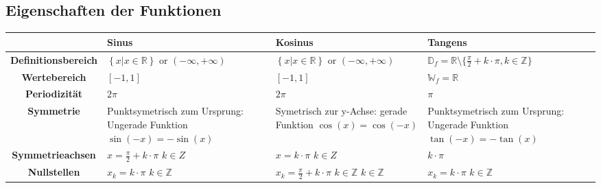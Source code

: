 \subsection{Eigenschaften der Funktionen}
\begin{tabularx}{1\textwidth} {
        | >{\raggedright\arraybackslash}c
        | >{\raggedright\arraybackslash}X
        | >{\raggedright\arraybackslash}X
        | >{\raggedright\arraybackslash}X |}
    \hline
                                & \textbf{Sinus}                                                       & \textbf{Kosinus}                                                             & \textbf{Tangens}                                                                       \\\hline
    \textbf{Definitionsbereich} & $\left\{ x|x\in\mathbb{R}\right\}$ or $\left(-\infty,+\infty\right)$ & $\left\{ x|x\in\mathbb{R}\right\}$ or $\left(-\infty,+\infty\right)$         & $\mathbb{D}_f = \mathbb{R}\setminus\{\tfrac{\pi}{2} + k \cdot \pi, k \in \mathbb{Z}\}$ \\ \hline
    \textbf{Wertebereich}       & $\left[-1,1\right]$                                                  & $\left[-1,1\right]$                                                          & $\mathbb{W}_f = \mathbb{R}$                                                            \\ \hline
    \textbf{Periodizität}       & $2\pi$                                                               & $2\pi$                                                                       & $\pi$                                                                                  \\ \hline
    \textbf{Symmetrie}          & Punktsymetrisch zum Ursprung: Ungerade Funktion $\sin(-x)=-\sin(x)$  & Symetrisch zur y-Achse: gerade Funktion $\cos(x) = \cos(-x)$                 & Punktsymetrisch zum Ursprung: Ungerade Funktion $\tan(-x)=-\tan(x)$                    \\ \hline
    \textbf{Symmetrieachsen}    & $x=\frac{\pi}{2}+k\cdot \pi$ $k \in Z$                               & $x=k\cdot \pi$ $k \in Z$                                                     & $k \cdot \pi$                                                                          \\ \hline
    \textbf{Nullstellen}        & $x_k = k \cdot \pi$ $k \in \mathbb{Z}$                               & $x_k = \frac{\pi}{2} + k \cdot \pi$ $k \in \mathbb{Z}$    $k \in \mathbb{Z}$ & $x_k = k \cdot \pi$   $k \in \mathbb{Z}$                                               \\ \hline

\end{tabularx}
